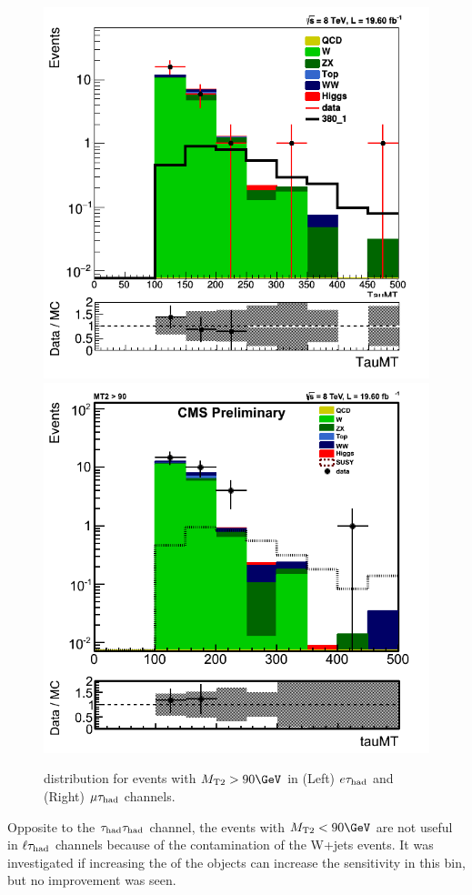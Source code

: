 \begin{figure}[!Hhtb]
\centering
\includegraphics[angle=0,scale=0.35]{SelectionEleTau/TauMT.png}
\includegraphics[angle=0,scale=0.35]{SelectionMuTau/tauMT_Ratio_MT2gt90_unBlinded.png}
\caption{\tauMT distribution for events with $\mttwo>90\GeV$ in (Left) $e\tau_{\rm had}$ and (Right) $\mu\tau_{\rm had}$ channels.}
\label{fig:taumtleptontau}
\end{figure}
Opposite to the $\tau_{\rm had}\tau_{\rm had}$ channel, the events with $\mttwo<90 \GeV$ are not useful in $\ell\tau_{\rm had}$ channels because of the contamination of
the W+jets events. It was investigated if increasing the \pt of the objects can increase the sensitivity in this bin, but no improvement was seen.

